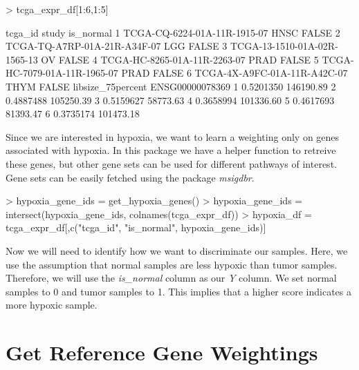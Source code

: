 \documentclass{article}
\begin{document}
\begin{Schunk}
\begin{Sinput}
> tcga_expr_df[1:6,1:5]
\end{Sinput}
\begin{Soutput}
                       tcga_id study is_normal
1 TCGA-CQ-6224-01A-11R-1915-07  HNSC     FALSE
2 TCGA-TQ-A7RP-01A-21R-A34F-07   LGG     FALSE
3 TCGA-13-1510-01A-02R-1565-13    OV     FALSE
4 TCGA-HC-8265-01A-11R-2263-07  PRAD     FALSE
5 TCGA-HC-7079-01A-11R-1965-07  PRAD     FALSE
6 TCGA-4X-A9FC-01A-11R-A42C-07  THYM     FALSE
  libsize_75percent ENSG00000078369
1         0.5201350       146190.89
2         0.4887488       105250.39
3         0.5159627        58773.63
4         0.3658994       101336.60
5         0.4617693        81393.47
6         0.3735174       101473.18
\end{Soutput}
\end{Schunk}

Since we are interested in hypoxia, we want to learn a weighting only on genes
associated with hypoxia. In this package we have a helper function to retreive
these genes, but other gene sets can be used for different pathways of interest.
Gene sets can be easily fetched using the package \emph{msigdbr}.
\begin{Schunk}
\begin{Sinput}
> hypoxia_gene_ids = get_hypoxia_genes()
> hypoxia_gene_ids = intersect(hypoxia_gene_ids, colnames(tcga_expr_df))
> hypoxia_df = tcga_expr_df[,c("tcga_id", "is_normal", hypoxia_gene_ids)]
\end{Sinput}
\end{Schunk}


Now we will need to identify how we want to discriminate our samples. Here, we
use the assumption that normal samples are less hypoxic than tumor samples.
Therefore, we will use the \emph{is\_normal} column as our \emph{Y} column.
We set normal samples to 0 and tumor samples to 1. This implies that a higher
score indicates a more hypoxic sample.

\begin{Schunk}
\end{Schunk}

\section{Get Reference Gene Weightings }
\end{document}
